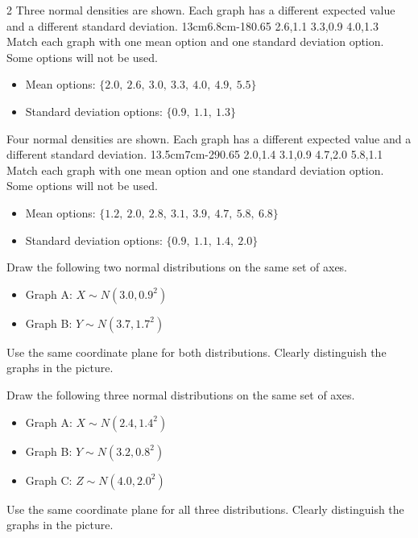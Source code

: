\begin{multicols}{2}
\vspace{-0.25cm}
Three normal densities are shown. Each graph has a different expected value and a different standard deviation.
\NormalThreeGraph
{13cm}{6.8cm}{-1}{8}{0.65}
{2.6,1.1}
{3.3,0.9}
{4.0,1.3}
Match each graph with one mean option and one standard deviation option. Some options will not be used.
\begin{itemize}
\item Mean options: $\{2.0,\ 2.6,\ 3.0,\ 3.3,\ 4.0,\ 4.9,\ 5.5\}$
\item Standard deviation options: $\{0.9,\ 1.1,\ 1.3\}$
\end{itemize}

\vspace{-0.25cm}
Four normal densities are shown. Each graph has a different expected value and a different standard deviation.
\NormalFourGraph
{13.5cm}{7cm}{-2}{9}{0.65}
{2.0,1.4}
{3.1,0.9}
{4.7,2.0}
{5.8,1.1}
Match each graph with one mean option and one standard deviation option. Some options will not be used.
\begin{itemize}
\item Mean options: $\{1.2,\ 2.0,\ 2.8,\ 3.1,\ 3.9,\ 4.7,\ 5.8,\ 6.8\}$
\item Standard deviation options: $\{ 0.9,\ 1.1,\ 1.4,\ 2.0\}$
\end{itemize}

\vspace{-0.25cm}
Draw the following two normal distributions on the same set of axes.
\begin{itemize}
\item Graph A: $X\sim N(3.0,0.9^2)$
\item Graph B: $Y\sim N(3.7,1.7^2)$
\end{itemize}
Use the same coordinate plane for both distributions. Clearly distinguish the graphs in the picture.

\vspace{-0.25cm}
Draw the following three normal distributions on the same set of axes.
\begin{itemize}
\item Graph A: $X\sim N(2.4,1.4^2)$
\item Graph B: $Y\sim N(3.2,0.8^2)$
\item Graph C: $Z\sim N(4.0,2.0^2)$
\end{itemize}
Use the same coordinate plane for all three distributions. Clearly distinguish the graphs in the picture.


\end{multicols}
